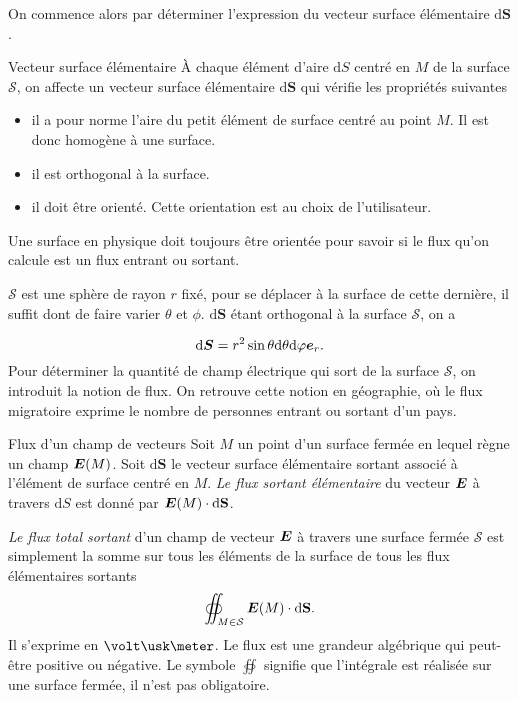 On commence alors par déterminer 
l'expression du vecteur surface élémentaire $\mathrm{d}\mathbf{S}$. 

\begin{defn}{Vecteur surface élémentaire}
	À chaque élément d'aire $\mathrm{d}S$ centré en $M$ de la surface $\mathcal{S}$, 
	on  affecte un vecteur surface élémentaire $\mathrm{d}\mathbf{S}$ 
	qui vérifie les propriétés suivantes
	\begin{itemize}
		\item il a pour norme l'aire du petit élément de surface centré 
		  au point $M$. Il est donc homogène à une surface.
		\item il est orthogonal à la surface.
		\item il doit être orienté. Cette orientation est au choix de 
		  l'utilisateur.
	\end{itemize}
\end{defn}

\begin{attention}
	Une surface en physique doit toujours être orientée pour savoir
	si le flux qu'on calcule est un flux entrant ou sortant.
\end{attention}

$\mathcal{S}$ est une sphère de rayon $r$ fixé, pour se déplacer à la surface 
de cette dernière, 
il suffit dont de faire varier $\theta$ et $\phi$. $\mathrm{d}\mathbf{S}$ 
étant orthogonal à la surface $\mathcal{S}$, on a

\begin{equation*}
	\ds = r^2 \sin \theta \dtheta \dphi \er.
\end{equation*}
Pour déterminer la quantité de champ électrique qui sort de la surface 
$\mathcal{S}$, on introduit la notion de flux. On retrouve cette notion en géographie,
 où le flux migratoire exprime le nombre de personnes entrant ou sortant d'un 
 pays.

\begin{defn}{Flux d'un champ de vecteurs}
	Soit $M$ un point d'un surface fermée en lequel règne un champ $\vece(M)$.
	Soit $\mathrm{d}\mathbf{S}$ le vecteur surface élémentaire sortant associé
	à l'élément de surface centré en $M$. \emph{Le flux sortant élémentaire} du 
	vecteur $\vece$ à travers $\mathrm{d}S$ est donné par
	$\vece(M) \cdot \mathrm{d}\mathbf{S}$.

	\emph{Le flux total sortant} d'un champ de vecteur $\vece$ à travers 
	une surface fermée
	$\mathcal{S}$ est simplement la somme sur tous les éléments de la surface de tous
	les flux élémentaires sortants
	\begin{equation}
		\oiint_{M \in \mathcal{S}} \vece(M) \cdot \mathrm{d}\mathbf{S}.
	\end{equation}
	Il s'exprime en $\volt \usk \meter$. Le flux est une grandeur algébrique
	qui peut-être positive ou négative. Le symbole $\oiint$ signifie que
	l'intégrale est réalisée sur une surface fermée, il n'est pas obligatoire.
\end{defn}

